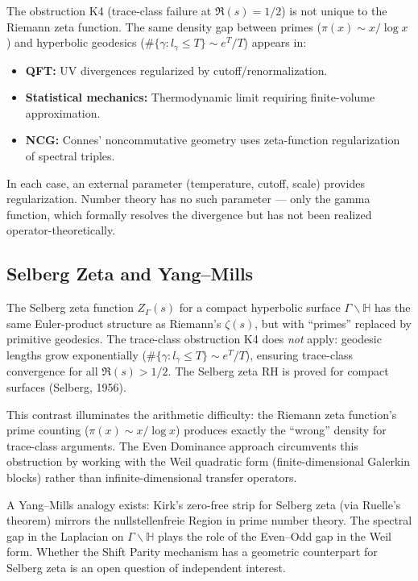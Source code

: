\documentclass[12pt,a4paper]{article}
\theoremstyle{definition}
\theoremstyle{remark}
\begin{document}
The obstruction K4 (trace-class failure at $\Re(s) = 1/2$) is not unique to the Riemann zeta function. The same density gap between primes ($\pi(x) \sim x/\log x$) and hyperbolic geodesics ($\#\{\gamma: l_\gamma \leq T\} \sim e^T/T$) appears in:
\begin{itemize}
  \item \textbf{QFT:} UV divergences regularized by cutoff/renormalization.
  \item \textbf{Statistical mechanics:} Thermodynamic limit requiring finite-volume approximation.
  \item \textbf{NCG:} Connes' noncommutative geometry uses zeta-function regularization of spectral triples.
\end{itemize}
In each case, an external parameter (temperature, cutoff, scale) provides regularization. Number theory has no such parameter --- only the gamma function, which formally resolves the divergence but has not been realized operator-theoretically.

\subsection{Selberg Zeta and Yang--Mills}

The Selberg zeta function $Z_\Gamma(s)$ for a compact hyperbolic surface $\Gamma \backslash \mathbb{H}$ has the same Euler-product structure as Riemann's $\zeta(s)$, but with ``primes'' replaced by primitive geodesics. The trace-class obstruction K4 does \emph{not} apply: geodesic lengths grow exponentially ($\#\{\gamma: l_\gamma \leq T\} \sim e^T/T$), ensuring trace-class convergence for all $\Re(s) > 1/2$. The Selberg zeta RH is proved for compact surfaces (Selberg, 1956).

This contrast illuminates the arithmetic difficulty: the Riemann zeta function's prime counting ($\pi(x) \sim x/\log x$) produces exactly the ``wrong'' density for trace-class arguments. The Even Dominance approach circumvents this obstruction by working with the Weil quadratic form (finite-dimensional Galerkin blocks) rather than infinite-dimensional transfer operators.

A Yang--Mills analogy exists: Kirk's zero-free strip for Selberg zeta (via Ruelle's theorem) mirrors the nullstellenfreie Region in prime number theory. The spectral gap in the Laplacian on $\Gamma \backslash \mathbb{H}$ plays the role of the Even--Odd gap in the Weil form. Whether the Shift Parity mechanism has a geometric counterpart for Selberg zeta is an open question of independent interest.
\end{document}

